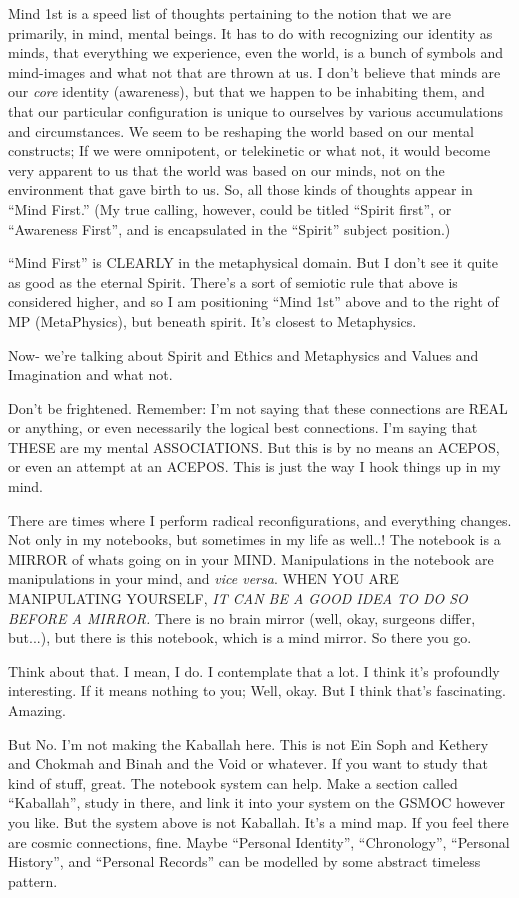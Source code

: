 \documentclass[oneside]{book}
\begin{document}
Mind 1st is a speed list of thoughts pertaining to the notion that we
are primarily, in mind, mental beings. It has to do with recognizing
our identity as minds, that everything we experience, even the world,
is a bunch of symbols and mind-images and what not that are thrown at
us. I don't believe that minds are our \emph{core} identity (awareness),
but that we happen to be inhabiting them, and that our particular
configuration is unique to ourselves by various accumulations and
circumstances. We seem to be reshaping the world based on our mental
constructs; If we were omnipotent, or telekinetic or what not, it
would become very apparent to us that the world was based on our
minds, not on the environment that gave birth to us. So, all those
kinds of thoughts appear in ``Mind First.'' (My true calling, however,
could be titled ``Spirit first'', or ``Awareness First'', and is
encapsulated in the ``Spirit'' subject position.)

``Mind First'' is CLEARLY in the metaphysical domain. But I don't see it
quite as good as the eternal Spirit. There's a sort of semiotic rule
that above is considered higher, and so I am positioning ``Mind 1st''
above and to the right of MP (MetaPhysics), but beneath spirit. It's
closest to Metaphysics.

Now- we're talking about Spirit and Ethics and Metaphysics and Values
and Imagination and what not.

Don't be frightened. Remember: I'm not saying that these connections
are REAL or anything, or even necessarily the logical best
connections. I'm saying that THESE are my mental ASSOCIATIONS. But
this is by no means an ACEPOS, or even an attempt at an ACEPOS. This
is just the way I hook things up in my mind.

There are times where I perform radical reconfigurations, and
everything changes. Not only in my notebooks, but sometimes in my life
as well..! The notebook is a MIRROR of whats going on in your
MIND. Manipulations in the notebook are manipulations in your mind,
and \emph{vice versa}. WHEN YOU ARE MANIPULATING YOURSELF, \emph{IT CAN BE A
GOOD IDEA TO DO SO BEFORE A MIRROR.} There is no brain mirror (well,
okay, surgeons differ, but...), but there is this notebook, which is a
mind mirror. So there you go.

Think about that. I mean, I do. I contemplate that a lot. I think it's
profoundly interesting. If it means nothing to you; Well, okay. But I
think that's fascinating. Amazing.

But No. I'm not making the Kaballah here. This is not Ein Soph and
Kethery and Chokmah and Binah and the Void or whatever. If you want to
study that kind of stuff, great. The notebook system can help. Make a
section called ``Kaballah'', study in there, and link it into your
system on the GSMOC however you like. But the system above is not
Kaballah. It's a mind map. If you feel there are cosmic connections,
fine. Maybe ``Personal Identity'', ``Chronology'', ``Personal History'', and
``Personal Records'' can be modelled by some abstract timeless pattern.
\end{document}
